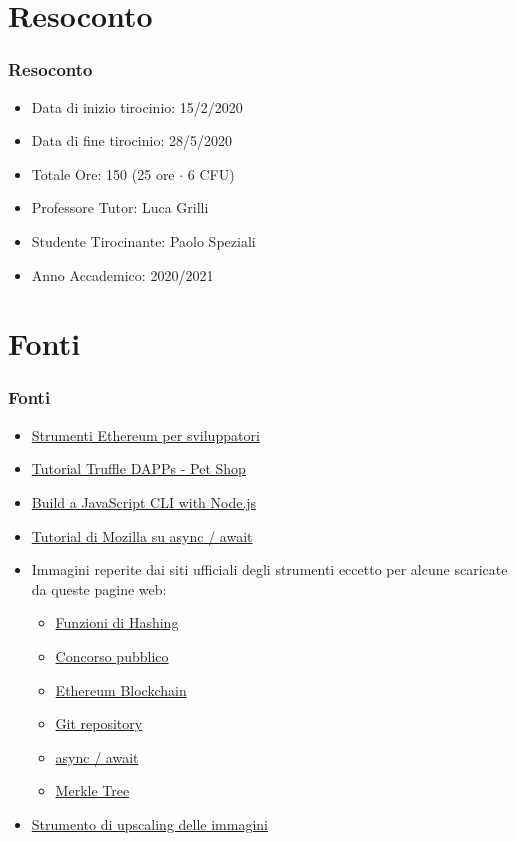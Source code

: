 \documentclass{beamer}
\begin{document}
\section{Resoconto}
\begin{frame}
	\frametitle{Resoconto}
	\begin{itemize}
		\item Data di inizio tirocinio: 15/2/2020
  		\item Data di fine tirocinio: 28/5/2020
  		\item Totale Ore: 150 (25 ore \(\cdot\) 6 CFU)
  		\item Professore Tutor: Luca Grilli
  		\item Studente Tirocinante: Paolo Speziali
  		\item Anno Accademico: 2020/2021
	\end{itemize}
\end{frame}
\section{Fonti}
\begin{frame}
	\frametitle{Fonti}
	\begin{itemize}
		\item \href{https://ethereum.org/it/developers/}{Strumenti Ethereum per sviluppatori} 
  		\item \href{https://www.trufflesuite.com/tutorial}{Tutorial Truffle DAPPs - Pet Shop}
  		\item \href{https://www.sitepoint.com/javascript-command-line-interface-cli-node-js/}{Build a JavaScript CLI with Node.js}
  		\item \href{https://developer.mozilla.org/en-US/docs/Learn/JavaScript/Asynchronous/Async_await}{Tutorial di Mozilla su async / await}
  		\item Immagini reperite dai siti ufficiali degli strumenti eccetto per alcune scaricate da queste pagine web:
			\begin{itemize}
				\item \href{https://www.poeticoding.com/hashing-a-file-in-elixir/}{Funzioni di Hashing}
				\item \href{https://www.romatoday.it/attualita/concorso-rai-fiera-roma-norme-covid-19.html}{Concorso pubblico}
				\item \href{https://www.criptovalute24.com/ethereum-migliora-la-sua-blockchain-rialzo-del-5-4/}{Ethereum Blockchain}
				\item \href{https://blog.netsons.com/git-software-guida-facile/}{Git repository}
				\item \href{https://amerlin.keantex.com/programmazione-asincrona-con-async-await-parte-2/}{async / await}
				\item \href{https://transparency.dev/verifiable-data-structures/}{Merkle Tree}
			\end{itemize}
			\item \href{https://waifu2x.booru.pics/Home/index}{Strumento di upscaling delle immagini} 
	\end{itemize}
\end{frame}
\end{document}
